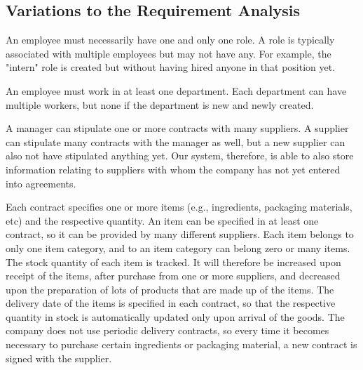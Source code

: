 \subsection{Variations to the Requirement Analysis}


An employee must necessarily have one and only one role. A role is typically associated with multiple employees but may not have any. For example, the "intern" role is created but without having hired anyone in that position yet.

An employee must work in at least one department. Each department can have multiple workers, but none if the department is new and newly created.

A manager can stipulate one or more contracts with many suppliers. A supplier can stipulate many contracts with the manager as well, but a new supplier can also not have stipulated anything yet. Our system, therefore, is able to also store information relating to suppliers with whom the company has not yet entered into agreements.

Each contract specifies one or more items (e.g., ingredients, packaging materials, etc) and the respective quantity. An item can be specified in at least one contract, so it can be provided by many different suppliers. Each item belongs to only one item category, and to an item category can belong zero or many items. The stock quantity of each item is tracked. It will therefore be increased upon receipt of the items, after purchase from one or more suppliers, and decreased upon the preparation of lots of products that are made up of the items. The delivery date of the items is specified in each contract, so that the respective quantity in stock is automatically updated only upon arrival of the goods. The company does not use periodic delivery contracts, so every time it becomes necessary to purchase certain ingredients or packaging material, a new contract is signed with the supplier.

